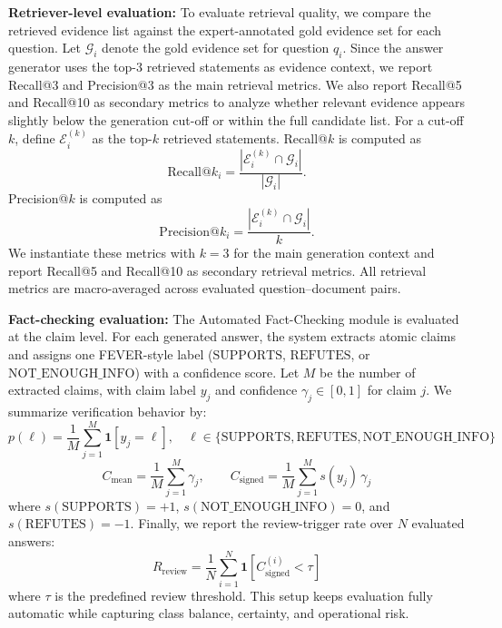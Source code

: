 \documentclass[sn-mathphys, oneside]{sn-jnl}
\begin{document}
\textbf{Retriever-level evaluation:} To evaluate retrieval quality, we compare the retrieved evidence list against the
expert-annotated gold evidence set for each question. Let $\mathcal{G}_i$ denote the
gold evidence set for question $q_i$. Since the answer generator uses the top-3 retrieved statements as evidence context, we report Recall@3 and Precision@3 as the main retrieval metrics. We also report
Recall@5 and Recall@10 as secondary metrics to analyze whether relevant evidence
appears slightly below the generation cut-off or within the full candidate list.
For a cut-off $k$, define $\mathcal{E}_i^{(k)}$ as the top-$k$ retrieved statements.
Recall@$k$ is computed as
\begin{equation}
    \mathrm{Recall@}k_i
    = \frac{|\mathcal{E}_i^{(k)} \cap \mathcal{G}_i|}{|\mathcal{G}_i|}.
    \label{eq:recallk}
\end{equation}
Precision@$k$ is computed as
\begin{equation}
    \mathrm{Precision@}k_i
    = \frac{|\mathcal{E}_i^{(k)} \cap \mathcal{G}_i|}{k}.
    \label{eq:precisionk}
\end{equation}
We instantiate these metrics with $k=3$ for the main generation context and report
Recall@5 and Recall@10 as secondary retrieval metrics. All retrieval metrics are
macro-averaged across evaluated question--document pairs.

\textbf{Fact-checking evaluation:} The Automated Fact-Checking module is evaluated at the claim level. For each generated
answer, the system extracts atomic claims and assigns one FEVER-style label
($\mathrm{SUPPORTS}$, $\mathrm{REFUTES}$, or $\mathrm{NOT\_ENOUGH\_INFO}$) with a confidence
score. Let $M$ be the number of extracted claims, with claim label $y_j$ and confidence
$\gamma_j \in [0,1]$ for claim $j$. We summarize verification behavior by:
\begin{equation}
    p(\ell) = \frac{1}{M} \sum_{j=1}^{M} \mathbf{1}[y_j = \ell],
    \quad \ell \in \{\mathrm{SUPPORTS},\mathrm{REFUTES},\mathrm{NOT\_ENOUGH\_INFO}\}
\end{equation}
\begin{equation}
    C_{\mathrm{mean}} = \frac{1}{M} \sum_{j=1}^{M} \gamma_j,
    \qquad
    C_{\mathrm{signed}} = \frac{1}{M} \sum_{j=1}^{M} s(y_j)\,\gamma_j
\end{equation}
where $s(\mathrm{SUPPORTS})=+1$, $s(\mathrm{NOT\_ENOUGH\_INFO})=0$, and
$s(\mathrm{REFUTES})=-1$. Finally, we report the review-trigger rate over $N$ evaluated
answers:
\begin{equation}
    R_{\mathrm{review}} = \frac{1}{N} \sum_{i=1}^{N}
    \mathbf{1}\!\left[C_{\mathrm{signed}}^{(i)} < \tau\right]
\end{equation}
where $\tau$ is the predefined review threshold. This setup keeps evaluation fully
automatic while capturing class balance, certainty, and operational risk.
\end{document}
